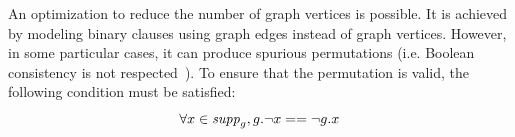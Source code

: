 %
%
%
An optimization to reduce the number of graph vertices is possible. It is achieved by modeling binary clauses
using graph edges instead of graph vertices.  However, in some particular cases, it can produce
spurious permutations (i.e. Boolean consistency is not respected~\cite{aloul2003solving}).
To ensure that the permutation is valid, the following condition must be satisfied:
$$\forall x \in \mathit{supp}_g, g.\neg x == \neg g.x$$

